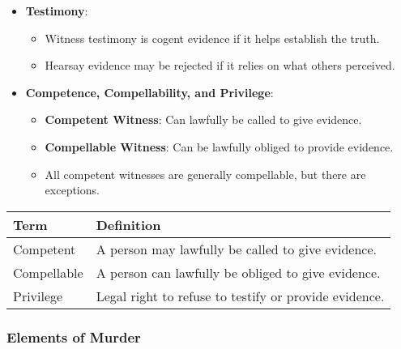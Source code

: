 \begin{itemize}
\tightlist
\item
  \textbf{Testimony}:

  \begin{itemize}
  \tightlist
  \item
    Witness testimony is cogent evidence if it helps establish the
    truth.
  \item
    Hearsay evidence may be rejected if it relies on what others
    perceived.
  \end{itemize}
\item
  \textbf{Competence, Compellability, and Privilege}:

  \begin{itemize}
  \tightlist
  \item
    \textbf{Competent Witness}: Can lawfully be called to give evidence.
  \item
    \textbf{Compellable Witness}: Can be lawfully obliged to provide
    evidence.
  \item
    All competent witnesses are generally compellable, but there are
    exceptions.
  \end{itemize}
\end{itemize}

\begin{longtable}[]{@{}
  >{\raggedright\arraybackslash}p{}
  >{\raggedright\arraybackslash}p{}@{}}
\toprule\noalign{}
\begin{minipage}[b]{\linewidth}\raggedright
Term
\end{minipage} & \begin{minipage}[b]{\linewidth}\raggedright
Definition
\end{minipage} \\
\midrule\noalign{}
\endhead
\bottomrule\noalign{}
\endlastfoot
Competent & A person may lawfully be called to give evidence. \\
Compellable & A person can lawfully be obliged to give evidence. \\
Privilege & Legal right to refuse to testify or provide evidence. \\
\end{longtable}

\subsubsection{Elements of Murder}\label{elements-of-murder}

